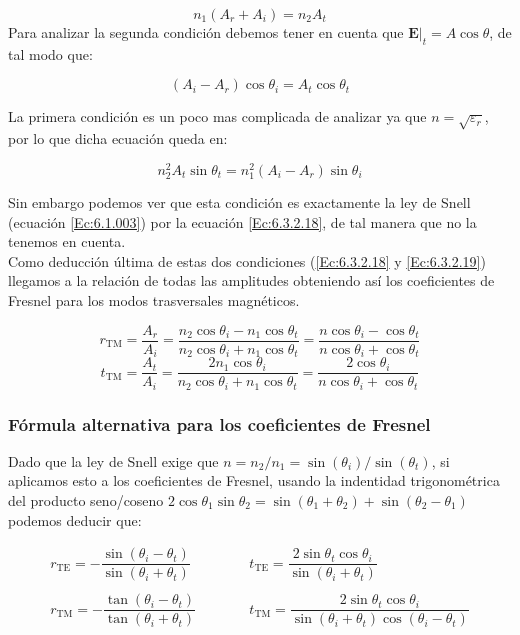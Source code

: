 \documentclass[12pt]{article}
\newcommand{\tquad}{\quad \quad \quad}
\newcommand{\En}{\mathbf{E}}
\numberwithin{equation}{section}
\numberwithin{figure}{section}
\begin{document}
\begin{equation}
n_1 (A_r + A_i) = n_2 A_t \label{Ec:6.3.2.18}
\end{equation}
Para analizar la segunda condición debemos tener en cuenta que $\En |_t = A \cos \theta $, de tal modo que:

\begin{equation} 
(A_i-A_r) \cos \theta_i = A_t \cos \theta_t  \label{Ec:6.3.2.19}
\end{equation}

La primera condición es un poco mas complicada de analizar ya que $n=\sqrt{\varepsilon_r}$, por lo que dicha ecuación queda en:

$$ n^2_2 A_t \sin \theta_t = n_1^2 (A_i-A_r) \sin \theta_i $$

Sin embargo podemos ver que esta condición es exactamente la ley de Snell (ecuación \ref{Ec:6.1.003}) por la ecuación \ref{Ec:6.3.2.18}, de tal manera que no la tenemos en cuenta. \\


Como deducción última de estas dos condiciones (\ref{Ec:6.3.2.18} y \ref{Ec:6.3.2.19}) llegamos a la relación de todas las amplitudes obteniendo así los coeficientes de Fresnel para los modos trasversales magnéticos.

\begin{equation}
r_{\mathrm{TM}} = \dfrac{A_r}{A_i} = \dfrac{n_2 \cos \theta_i - n_1 \cos \theta_t}{n_2 \cos \theta_i + n_1 \cos \theta_t} = \dfrac{ n \cos \theta_i - \cos \theta_t}{n \cos \theta_i + \cos \theta_t}
\end{equation}
\begin{equation}
t_{\mathrm{TM}} = \dfrac{A_t}{A_i} = \dfrac{ 2 n_1 \cos \theta_i }{n_2 \cos \theta_i + n_1 \cos \theta_t} = \dfrac{2 \cos \theta_i}{ n \cos \theta_i + \cos \theta_t}
\end{equation}

\subsubsection{Fórmula alternativa para los coeficientes de Fresnel}

Dado que la ley de Snell exige que $n=n_2/n_1 = \sin (\theta_i) / \sin (\theta_t)$, si aplicamos esto a los coeficientes de Fresnel, usando la indentidad trigonométrica del producto seno/coseno $2 \cos \theta_1 \sin \theta_2 = \sin(\theta_1+\theta_2) + \sin (\theta_2 - \theta_1)$ podemos deducir que:

\begin{equation}
\begin{array}{ll}
r_{\mathrm{TE}} = - \dfrac{\sin(\theta_i-\theta_t)}{\sin (\theta_i + \theta_t)}
\tquad &
t_{\mathrm{TE}} =  \dfrac{2 \sin \theta_t \cos \theta_i}{ \sin ( \theta_i +  \theta_t)}
\\ \\
r_{\mathrm{TM}} = - \dfrac{\tan(\theta_i-\theta_t)}{\tan (\theta_i+ \theta_t)}
\tquad &
t_{\mathrm{TM}} =  \dfrac{2 \sin \theta_t \cos \theta_i}{ \sin ( \theta_i +  \theta_t) \cos( \theta_i - \theta_t)}
\end{array}
\end{equation}
\end{document}
